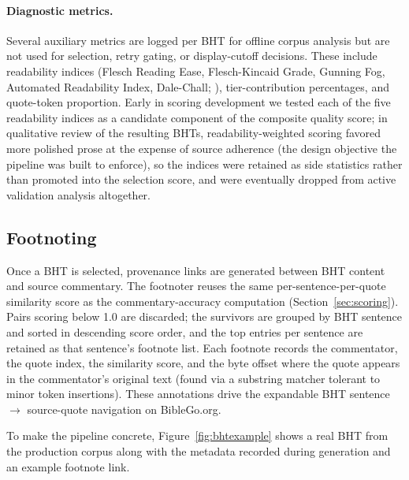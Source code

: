\paragraph{Diagnostic metrics.} Several auxiliary metrics are logged per BHT for offline corpus analysis but are not used for selection, retry gating, or display-cutoff decisions. These include readability indices (Flesch Reading Ease, Flesch-Kincaid Grade, Gunning Fog, Automated Readability Index, Dale-Chall; \citealt{flesch1948readability, kincaid1975readability, gunning1952fog, senter1967ari, dalechall1948}), tier-contribution percentages, and quote-token proportion. Early in scoring development we tested each of the five readability indices as a candidate component of the composite quality score; in qualitative review of the resulting BHTs, readability-weighted scoring favored more polished prose at the expense of source adherence (the design objective the pipeline was built to enforce), so the indices were retained as side statistics rather than promoted into the selection score, and were eventually dropped from active validation analysis altogether.

\subsection{Footnoting}
\label{sec:footnoting}

Once a BHT is selected, provenance links are generated between BHT content and source commentary. The footnoter reuses the same per-sentence-per-quote similarity score as the commentary-accuracy computation (Section~\ref{sec:scoring}). Pairs scoring below 1.0 are discarded; the survivors are grouped by BHT sentence and sorted in descending score order, and the top entries per sentence are retained as that sentence's footnote list. Each footnote records the commentator, the quote index, the similarity score, and the byte offset where the quote appears in the commentator's original text (found via a substring matcher tolerant to minor token insertions). These annotations drive the expandable BHT sentence $\to$ source-quote navigation on BibleGo.org.

To make the pipeline concrete, Figure~\ref{fig:bhtexample} shows a real BHT from the production corpus along with the metadata recorded during generation and an example footnote link.

